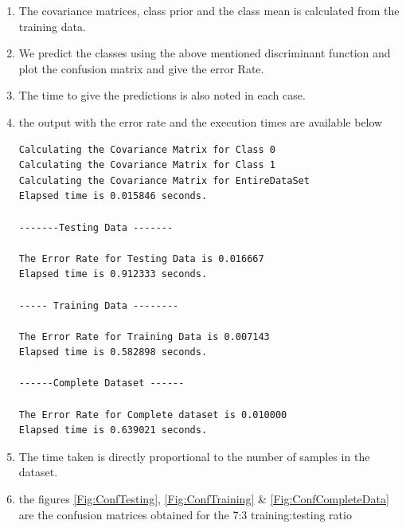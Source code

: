 \documentclass[10pt, letterpaper]{article}
\begin{document}
\begin{enumerate}
\item The covariance matrices, class prior and the class mean is calculated from the training data.

\item We predict the classes using the above mentioned discriminant function and plot the confusion matrix and give the error Rate. 

\item The time to give the predictions is also noted in each case.

\item the output with the error rate and the execution times are available below
\newpage
\begin{verbatim}
Calculating the Covariance Matrix for Class 0
Calculating the Covariance Matrix for Class 1
Calculating the Covariance Matrix for EntireDataSet
Elapsed time is 0.015846 seconds.

-------Testing Data -------

The Error Rate for Testing Data is 0.016667
Elapsed time is 0.912333 seconds.

----- Training Data --------

The Error Rate for Training Data is 0.007143
Elapsed time is 0.582898 seconds.

------Complete Dataset ------

The Error Rate for Complete dataset is 0.010000
Elapsed time is 0.639021 seconds.
\end{verbatim}
\item The time taken is directly proportional to the number of samples in the dataset. 
\item the figures \ref{Fig:ConfTesting}, \ref{Fig:ConfTraining} \& \ref{Fig:ConfCompleteData} are the confusion matrices obtained for the 7:3 training:testing ratio


\end{enumerate}
\end{document}
